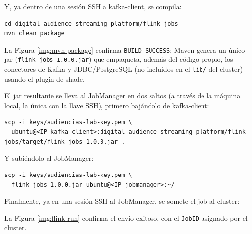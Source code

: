 Y, ya dentro de una sesión SSH a kafka-client, se compila:

\begin{lstlisting}[style=cmdbox]
cd digital-audience-streaming-platform/flink-jobs
mvn clean package
\end{lstlisting}

La Figura \ref{img:mvn-package} confirma \texttt{BUILD SUCCESS}: Maven genera un único jar (\texttt{flink-jobs-1.0.0.jar}) que empaqueta, además del código propio, los conectores de Kafka y JDBC/PostgreSQL (no incluidos en el \texttt{lib/} del cluster) usando el plugin de shade.


El jar resultante se lleva al JobManager en dos saltos (a través de la máquina local, la única con la llave SSH), primero bajándolo de kafka-client:

\begin{lstlisting}[style=cmdbox]
scp -i keys/audiencias-lab-key.pem \
  ubuntu@<IP-kafka-client>:digital-audience-streaming-platform/flink-jobs/target/flink-jobs-1.0.0.jar .
\end{lstlisting}


Y subiéndolo al JobManager:

\begin{lstlisting}[style=cmdbox]
scp -i keys/audiencias-lab-key.pem \
  flink-jobs-1.0.0.jar ubuntu@<IP-jobmanager>:~/
\end{lstlisting}


Finalmente, ya en una sesión SSH al JobManager, se somete el job al cluster:


La Figura \ref{img:flink-run} confirma el envío exitoso, con el \texttt{JobID} asignado por el cluster.


